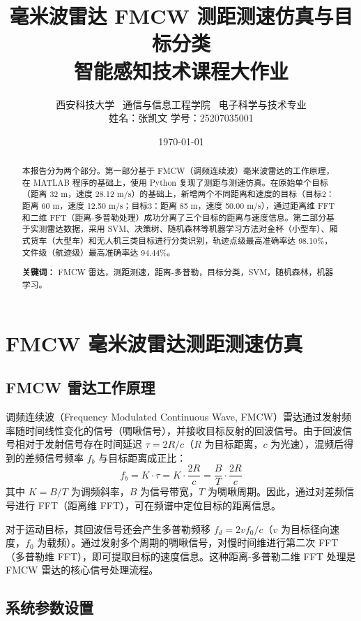 \documentclass[12pt,a4paper]{ctexart}
\title{\textbf{毫米波雷达 FMCW 测距测速仿真与目标分类}\\[0.4cm]
\large 智能感知技术课程大作业}
\author{西安科技大学 \ 通信与信息工程学院 \ 电子科学与技术专业 \\
姓名：张凯文 \quad 学号：25207035001}
\date{\today}
\begin{document}
\maketitle

\begin{abstract}
\noindent
本报告分为两个部分。第一部分基于 FMCW（调频连续波）毫米波雷达的工作原理，在 MATLAB 程序的基础上，使用 Python 复现了测距与测速仿真。在原始单个目标（距离 32 m，速度 28.12 m/s）的基础上，新增两个不同距离和速度的目标（目标2：距离 60 m，速度 12.50 m/s；目标3：距离 85 m，速度 50.00 m/s），通过距离维 FFT 和二维 FFT（距离-多普勒处理）成功分离了三个目标的距离与速度信息。第二部分基于实测雷达数据，采用 SVM、决策树、随机森林等机器学习方法对金杯（小型车）、厢式货车（大型车）和无人机三类目标进行分类识别，轨迹点级最高准确率达 98.10\%，文件级（航迹级）最高准确率达 94.44\%。

\noindent \textbf{关键词：} FMCW 雷达，测距测速，距离-多普勒，目标分类，SVM，随机森林，机器学习。
\end{abstract}

\section{FMCW 毫米波雷达测距测速仿真}

\subsection{FMCW 雷达工作原理}

调频连续波（Frequency Modulated Continuous Wave, FMCW）雷达通过发射频率随时间线性变化的信号（啁啾信号），并接收目标反射的回波信号。由于回波信号相对于发射信号存在时间延迟 $\tau = 2R/c$（$R$ 为目标距离，$c$ 为光速），混频后得到的差频信号频率 $f_b$ 与目标距离成正比：
\begin{equation}
    f_b = K \cdot \tau = K \cdot \frac{2R}{c} = \frac{B}{T} \cdot \frac{2R}{c}
\end{equation}
其中 $K = B/T$ 为调频斜率，$B$ 为信号带宽，$T$ 为啁啾周期。因此，通过对差频信号进行 FFT（距离维 FFT），可在频谱中定位目标的距离信息。

对于运动目标，其回波信号还会产生多普勒频移 $f_d = 2v f_0 / c$（$v$ 为目标径向速度，$f_0$ 为载频）。通过发射多个周期的啁啾信号，对慢时间维进行第二次 FFT（多普勒维 FFT），即可提取目标的速度信息。这种距离-多普勒二维 FFT 处理是 FMCW 雷达的核心信号处理流程。

\subsection{系统参数设置}
\end{document}

